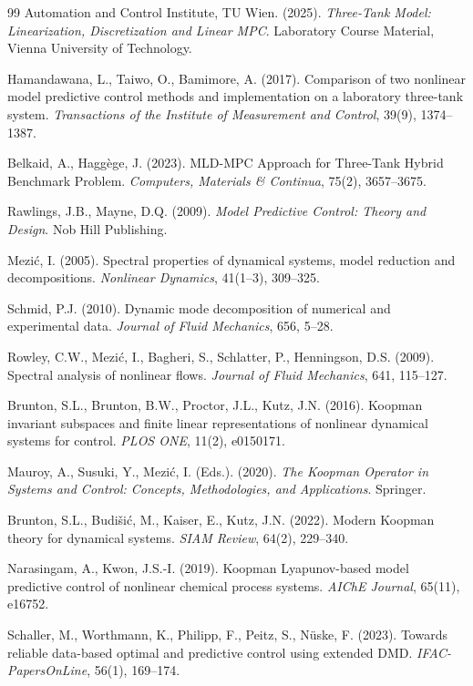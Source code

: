 \documentclass[12pt,letterpaper]{article}
\begin{document}
\begin{thebibliography}{99}
Automation and Control Institute, TU Wien. (2025). \textit{Three-Tank 
Model: Linearization, Discretization and Linear MPC}. Laboratory 
Course Material, Vienna University of Technology.

Hamandawana, L., Taiwo, O., Bamimore, A. (2017). Comparison of two 
nonlinear model predictive control methods and implementation on a 
laboratory three-tank system. \textit{Transactions of the Institute 
of Measurement and Control}, 39(9), 1374--1387.

Belkaid, A., Haggège, J. (2023). MLD-MPC Approach for Three-Tank 
Hybrid Benchmark Problem. \textit{Computers, Materials \& Continua}, 
75(2), 3657--3675.

Rawlings, J.B., Mayne, D.Q. (2009). \textit{Model Predictive Control: 
Theory and Design}. Nob Hill Publishing.

Mezić, I. (2005). Spectral properties of dynamical systems, model 
reduction and decompositions. \textit{Nonlinear Dynamics}, 
41(1--3), 309--325.

Schmid, P.J. (2010). Dynamic mode decomposition of numerical and 
experimental data. \textit{Journal of Fluid Mechanics}, 656, 5--28.

Rowley, C.W., Mezić, I., Bagheri, S., Schlatter, P., Henningson, D.S. 
(2009). Spectral analysis of nonlinear flows. \textit{Journal of 
Fluid Mechanics}, 641, 115--127.

Brunton, S.L., Brunton, B.W., Proctor, J.L., Kutz, J.N. (2016). 
Koopman invariant subspaces and finite linear representations of 
nonlinear dynamical systems for control. \textit{PLOS ONE}, 11(2), 
e0150171.

Mauroy, A., Susuki, Y., Mezić, I. (Eds.). (2020). \textit{The Koopman 
Operator in Systems and Control: Concepts, Methodologies, and 
Applications}. Springer.

Brunton, S.L., Budišić, M., Kaiser, E., Kutz, J.N. (2022). Modern 
Koopman theory for dynamical systems. \textit{SIAM Review}, 64(2), 
229--340.

Narasingam, A., Kwon, J.S.-I. (2019). Koopman Lyapunov-based model 
predictive control of nonlinear chemical process systems. 
\textit{AIChE Journal}, 65(11), e16752.

Schaller, M., Worthmann, K., Philipp, F., Peitz, S., Nüske, F. (2023). 
Towards reliable data-based optimal and predictive control using 
extended DMD. \textit{IFAC-PapersOnLine}, 56(1), 169--174.


\end{thebibliography}
\end{document}
